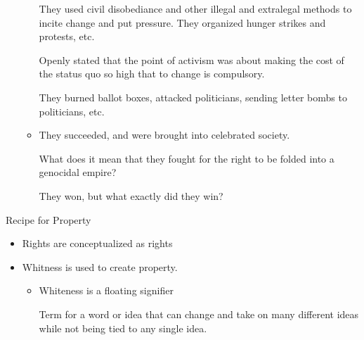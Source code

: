 \documentclass{report}
\begin{document}
\begin{description}
\begin{itemize}
\begin{itemize}
\begin{mdframed}
                            They used civil disobediance and
                            other illegal and extralegal
                            methods to incite change and put
                            pressure. They organized hunger strikes
                            and protests, etc.

                            Openly stated that the point of
                            activism was about making the cost
                            of the status quo so high that
                            to change is compulsory.

                            They burned ballot boxes, attacked
                            politicians, sending letter bombs
                            to politicians, etc.
                        \end{mdframed}
                    \item They succeeded, and were brought into
                        celebrated society. 
                        \begin{mdframed}
                            What does it mean that they fought
                            for the right to be folded into
                            a genocidal empire?

                            They won, but what exactly did they
                            win?
                        \end{mdframed}
                \end{itemize}
        \end{itemize}
    \item {\large Recipe for Property}
        \begin{itemize}
            \item Rights are conceptualized as rights
            \item Whitness is used to create property.
                \begin{itemize}
                    \item Whiteness is a floating signifier
                        \begin{mdframed}
                            Term for a word or idea that can
                            change and take on many different
                            ideas while not being tied to any
                            single idea.


\end{mdframed}
\end{itemize}
\end{itemize}
\end{description}
\end{document}
